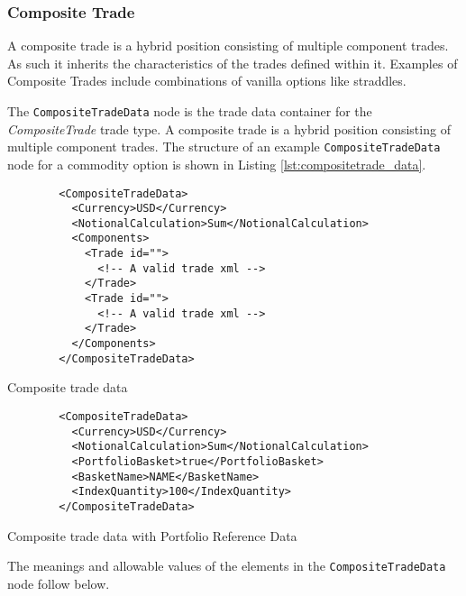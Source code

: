 \subsubsection{Composite Trade}

A composite trade is a hybrid position consisting of multiple component trades. As such it inherits the characteristics of the trades defined within it. Examples of Composite Trades include combinations of vanilla options like straddles.

The \lstinline!CompositeTradeData!  node is the trade data container for the  \emph{CompositeTrade} trade type.   A composite trade is a hybrid position consisting of multiple component trades. The structure of an example \lstinline!CompositeTradeData! node for a commodity option is shown in 
Listing \ref{lst:compositetrade_data}.

\begin{listing}[H]
	\begin{verbatim}
		<CompositeTradeData>
		  <Currency>USD</Currency>
		  <NotionalCalculation>Sum</NotionalCalculation>
		  <Components>
		    <Trade id="">
		      <!-- A valid trade xml -->
		    </Trade>
		    <Trade id="">
		      <!-- A valid trade xml -->
		    </Trade>
		  </Components>
		</CompositeTradeData>
	\end{verbatim}
	\caption{Composite trade data}
	\label{lst:compositetrade_data}
\end{listing}

\begin{listing}[H]
	\begin{verbatim}
		<CompositeTradeData>
		  <Currency>USD</Currency>
		  <NotionalCalculation>Sum</NotionalCalculation>
		  <PortfolioBasket>true</PortfolioBasket>
		  <BasketName>NAME</BasketName>
          <IndexQuantity>100</IndexQuantity>
		</CompositeTradeData>
	\end{verbatim}
	\caption{Composite trade data with Portfolio Reference Data}
\end{listing}

The meanings and allowable values of the elements in the \lstinline!CompositeTradeData!  node follow below.

